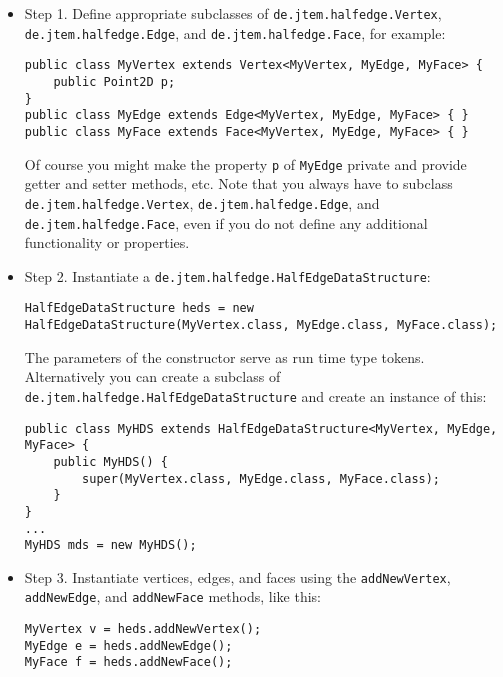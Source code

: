 \begin{itemize}
\item{Step 1.} 
Define appropriate subclasses of {\tt de.jtem.halfedge.Vertex}, {\tt de.jtem.halfedge.Edge}, and 
{\tt de.jtem.halfedge.Face}, for example:

\begin{lstlisting}[numbers=none]
public class MyVertex extends Vertex<MyVertex, MyEdge, MyFace> {
	public Point2D p;
}
public class MyEdge extends Edge<MyVertex, MyEdge, MyFace> { }
public class MyFace extends Face<MyVertex, MyEdge, MyFace> { }
\end{lstlisting}

Of course you might make the property {\tt p} of {\tt MyEdge} private and provide getter and setter 
methods, etc. Note that you always have to subclass {\tt de.jtem.halfedge.Vertex}, 
{\tt de.jtem.halfedge.Edge}, and {\tt de.jtem.halfedge.Face}, even if you do not define any 
additional functionality or properties.

\item{Step 2.} 
Instantiate a {\tt de.jtem.halfedge.HalfEdgeDataStructure}:

\begin{lstlisting}[numbers=none]
HalfEdgeDataStructure heds = new HalfEdgeDataStructure(MyVertex.class, MyEdge.class, MyFace.class);
\end{lstlisting}

The parameters of the constructor serve as run time type tokens. Alternatively you can create a subclass
of {\tt de.jtem.halfedge.HalfEdgeDataStructure} and create an instance of this:

\begin{lstlisting}[numbers=none]
public class MyHDS extends HalfEdgeDataStructure<MyVertex, MyEdge, MyFace> {
	public MyHDS() {
		super(MyVertex.class, MyEdge.class, MyFace.class);
	}
}
...
MyHDS mds = new MyHDS();
\end{lstlisting}

\item{Step 3.} 
Instantiate vertices, edges, and faces using the {\tt addNewVertex}, {\tt addNewEdge}, and 
{\tt addNewFace} methods, like this:

\begin{lstlisting}[numbers=none]
MyVertex v = heds.addNewVertex();
MyEdge e = heds.addNewEdge();
MyFace f = heds.addNewFace();
\end{lstlisting}

\end{itemize}

